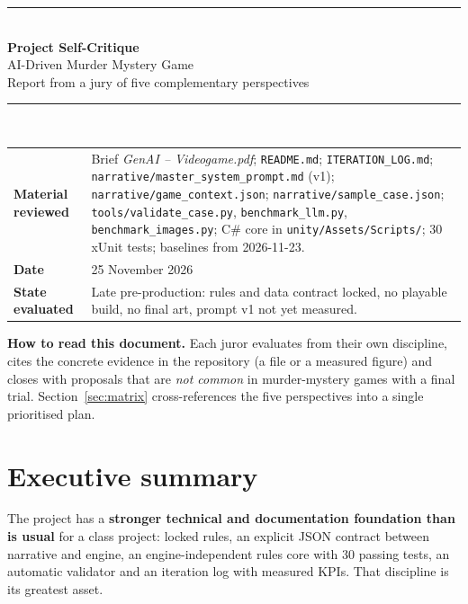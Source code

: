 \documentclass[11pt,a4paper]{article}
\newcommand{\file}[1]{\texttt{\small #1}}
\begin{document}
\begin{titlepage}
\centering
\vspace*{2.5cm}
{\color{neon}\rule{\linewidth}{2pt}}\\[0.6cm]
{\Huge\bfseries\color{ink} Project Self-Critique\\[0.3cm]}
{\LARGE\color{ink} AI-Driven Murder Mystery Game\\[0.4cm]}
{\large Report from a jury of five complementary perspectives}\\[0.4cm]
{\color{neon}\rule{\linewidth}{2pt}}\\[1.5cm]

\begin{tabularx}{0.85\linewidth}{>{\bfseries}l X}
Material reviewed & Brief \emph{GenAI -- Videogame.pdf}; \file{README.md}; \file{ITERATION\_LOG.md};
\file{narrative/master\_system\_prompt.md} (v1); \file{narrative/game\_context.json};
\file{narrative/sample\_case.json}; \file{tools/validate\_case.py}, \file{benchmark\_llm.py},
\file{benchmark\_images.py}; C\# core in \file{unity/Assets/Scripts/}; 30 xUnit tests;
baselines from 2026-11-23. \\[4pt]
Date & 25 November 2026 \\[4pt]
State evaluated & Late pre-production: rules and data contract locked, no playable build,
no final art, prompt v1 not yet measured. \\
\end{tabularx}

\vfill
\begin{perfil}
\textbf{How to read this document.} Each juror evaluates from their own discipline, cites the
concrete evidence in the repository (a file or a measured figure) and closes with proposals that are
\emph{not common} in murder-mystery games with a final trial. Section~\ref{sec:matrix} cross-references
the five perspectives into a single prioritised plan.
\end{perfil}
\end{titlepage}

\tableofcontents
\newpage

\section{Executive summary}

The project has a \textbf{stronger technical and documentation foundation than is usual} for a
class project: locked rules, an explicit JSON contract between narrative and engine, an
engine-independent rules core with 30 passing tests, an automatic validator and an iteration log
with measured KPIs. That discipline is its greatest asset.
\end{document}
